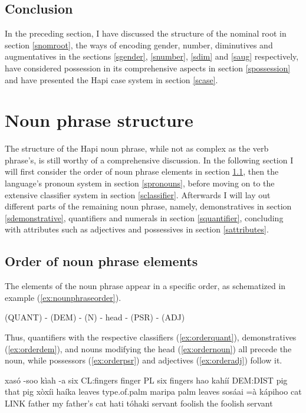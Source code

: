 \documentclass[a4paper, 12pt, oneside]{memoir}
\begin{document}
\subsection{Conclusion}
In the preceding section, I have discussed the structure of the nominal root in section \ref{snomroot}, the ways of encoding gender, number, diminutives and augmentatives in the sections \ref{sgender}, \ref{snumber}, \ref{sdim} and \ref{saug} respectively, have considered possession in its comprehensive aspects in section \ref{spossession} and have presented the Hapi case system in section \ref{scase}.
\section{Noun phrase structure}\label{snounphrase}
The structure of the Hapi noun phrase, while not as complex as the verb phrase's, is still worthy of a comprehensive discussion. In the following section I will first consider the order of noun phrase elements in section \ref{snounorder}, then the language's pronoun system in section \ref{spronouns}, before moving on to the extensive classifier system in section \ref{sclassifier}. Afterwards I will lay out different parts of the remaining noun phrase, namely, demonstratives in section \ref{sdemonstrative}, quantifiers and numerals in section \ref{squantifier}, concluding with attributes such as adjectives and possessives in section \ref{sattributes}. 
\subsection{Order of noun phrase elements}\label{snounorder}
The elements of the noun phrase appear in a specific order, as schematized in example (\ref{ex:nounphraseorder}).
\begin{examples}
\ex \label{ex:nounphraseorder}
(QUANT) - (DEM) - (N) - head -  (PSR) - (ADJ) 
\end{examples}
Thus, quantifiers with the respective classifiers (\ref{ex:orderquant}), demonstratives (\ref{ex:orderdem}), and nouns modifying the head (\ref{ex:ordernoun}) all precede the noun, while possessors (\ref{ex:orderpsr}) and adjectives (\ref{ex:orderadj}) follow it.
\begin{examples}
\ex \label{ex:orderquant}
\bits xasó -soo kìah -a
\gloss six CL:fingers finger PL
\tr six fingers
\ex \label{ex:orderdem}
\bits hao kahíí
\gloss DEM:DIST pig
\tr that pig
\ex \label{ex:ordernoun}
\bits xòxíi haíka
\gloss leaves type.of.palm
\tr maripa palm leaves
\ex \label{ex:orderpsr}
\bits sosáai =à kápihoo
\gloss cat LINK father
\tr my father's cat
\ex \label{ex:orderadj}
\bits hati tóhaki
\gloss servant foolish
\tr the foolish servant
\end{examples}
\end{document}
